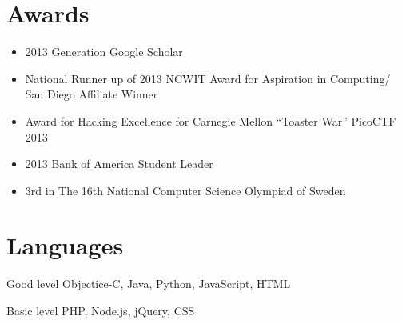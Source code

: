 \documentclass{tccv}
\begin{document}
\section{Awards}
\begin{itemize}
  \item 2013 Generation Google Scholar
  \item National Runner up of 2013 NCWIT Award for Aspiration in Computing/ San Diego Affiliate Winner
  \item Award for Hacking Excellence for Carnegie Mellon “Toaster War” PicoCTF 2013 
  \item 2013 Bank of America Student Leader 
  \item 3rd in The 16th National Computer Science Olympiad of Sweden
\end{itemize}

\section{Languages}

\begin{factlist}

\item{Good level}
     {Objectice-C, Java, Python, JavaScript, HTML}

\item{Basic level}
     {PHP, Node.js, jQuery, CSS}     
\end{factlist}
\end{document}
